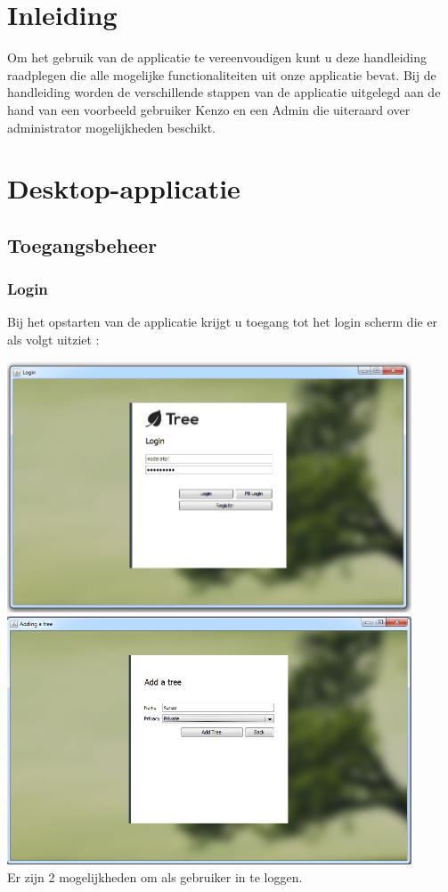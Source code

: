 \documentclass[pdftex,a4paper,12pt,twoside]{report}
\begin{document}


\tableofcontents
\chapter{Inleiding}\label{ch:preface}
Om het gebruik van de applicatie te vereenvoudigen kunt u deze handleiding raadplegen die alle mogelijke functionaliteiten uit onze applicatie bevat.
Bij de handleiding worden de verschillende stappen van de applicatie uitgelegd aan de hand van een voorbeeld gebruiker Kenzo en een Admin die uiteraard over administrator mogelijkheden beschikt.


\chapter{Desktop-applicatie}
\section{Toegangsbeheer}\label{ch:preface}
\subsection{Login}
Bij het opstarten van de applicatie krijgt u toegang tot het login scherm die er als volgt uitziet :

\includegraphics[width=12cm]{images/login.png}\\[.5cm]

\includegraphics[width=12cm]{images/add_tree.png}\\[.5cm]
Er zijn 2 mogelijkheden om als gebruiker in te loggen.
\end{document}
